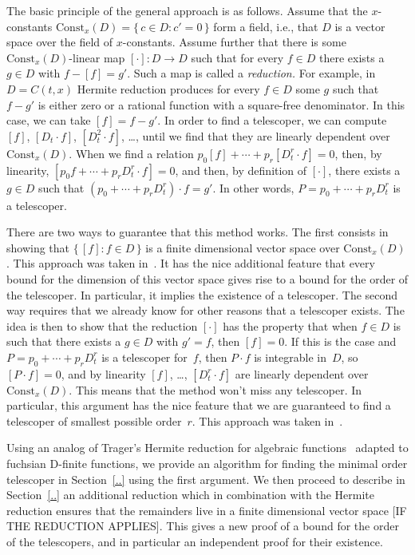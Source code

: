 \documentclass{sig-alternate}
\begin{document}
The basic principle of the general approach is as follows. Assume that the
$x$-constants $\mathrm{Const}_x(D)=\{\,c\in D:c'=0\,\}$ form a field, i.e., that $D$
is a vector space over the field of $x$-constants. Assume further that there is
some $\mathrm{Const}_x(D)$-linear map $[\cdot]\colon D\to D$ such that for every
$f\in D$ there exists a $g\in D$ with $f-[f]=g'$. Such a map is called a
\emph{reduction.} For example, in $D=C(t,x)$ Hermite reduction produces for
every $f\in D$ some $g$ such that $f-g'$ is either zero or a rational function
with a square-free denominator. In this case, we can take $[f]=f-g'$.
In order to find a telescoper, we can compute $[f]$, $[D_t\cdot f]$, $[D_t^2\cdot f]$, \dots,
until we find that they are linearly dependent over $\mathrm{Const}_x(D)$.
When we find a relation
$p_0[f] + \cdots + p_r[D_t^r\cdot f] = 0$,
then, by linearity,
$[p_0 f + \cdots + p_r D_t^r\cdot f] = 0$,
and then, by definition of $[\cdot]$, there exists a $g\in D$ such that $(p_0+\cdots + p_rD_t^r)\cdot f=g'$.
In other words, $P=p_0+\cdots + p_rD_t^r$ is a telescoper. 

There are two ways to guarantee that this method works. The first consists in
showing that $\{\,[f]:f\in D\,\}$ is a finite dimensional vector space over
$\mathrm{Const}_x(D)$. This approach was taken in~\cite{..,..,..}. It has the
nice additional feature that every bound for the dimension of this vector space
gives rise to a bound for the order of the telescoper. In particular, it implies
the existence of a telescoper. The second way requires that we already know for
other reasons that a telescoper exists. The idea is then to show that the
reduction $[\cdot]$ has the property that when $f\in D$ is such that there
exists a $g\in D$ with $g'=f$, then $[f]=0$. If this is the case and
$P=p_0+\cdots+p_rD_t^r$ is a telescoper for~$f$, then $P\cdot f$ is integrable
in~$D$, so $[P\cdot f]=0$, and by linearity $[f]$, \dots, $[D_t^r\cdot f]$ are
linearly dependent over $\mathrm{Const}_x(D)$. This means that the method won't
miss any telescoper. In particular, this argument has the nice feature that we
are guaranteed to find a telescoper of smallest possible order~$r$. This
approach was taken in~\cite{..}.

Using an analog of Trager's Hermite reduction for algebraic
functions~\cite{..,..}  adapted to fuchsian D-finite functions, we provide an
algorithm for finding the minimal order telescoper in Section~\ref{..} using the
first argument. We then proceed to describe in Section~\ref{..} an additional
reduction which in combination with the Hermite reduction ensures that the
remainders live in a finite dimensional vector space [IF THE REDUCTION
  APPLIES]. This gives a new proof of a bound for the order of the telescopers,
and in particular an independent proof for their existence.
\end{document}

